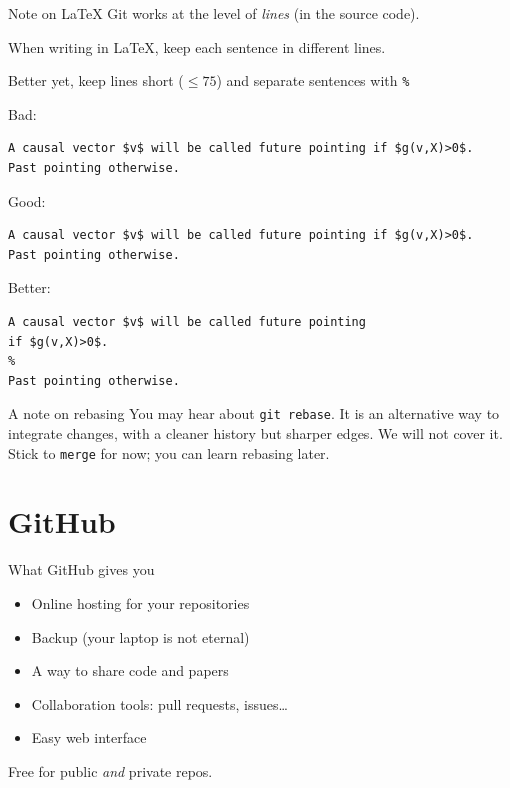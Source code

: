\documentclass[11pt]{beamer}
\begin{document}
\begin{frame}[fragile]{Note on \LaTeX}
  Git works at the level of \emph{lines} (in the source code).

  When writing in \LaTeX, keep each sentence in different
  lines.
  
  Better yet, keep lines short ($\leq 75$) and separate sentences
  with \texttt{\%}

  \vfill
  {\color{red} Bad:}
\begin{lstlisting}
A causal vector $v$ will be called future pointing if $g(v,X)>0$.  Past pointing otherwise.
\end{lstlisting}
  {\color{blue} Good:}
\begin{lstlisting}
A causal vector $v$ will be called future pointing if $g(v,X)>0$.
Past pointing otherwise.
\end{lstlisting}
  {\color{blue} Better:}
\begin{lstlisting}
A causal vector $v$ will be called future pointing
if $g(v,X)>0$.
%
Past pointing otherwise.
\end{lstlisting}
\end{frame}


\begin{frame}{A note on rebasing}
  You may hear about \texttt{git rebase}.
  \vfill
  It is an alternative way to integrate changes, with a cleaner history
  but sharper edges.
  \vfill
  \alert{We will not cover it.} Stick to \texttt{merge} for now;
  you can learn rebasing later.
\end{frame}

\section{GitHub}

\begin{frame}{What GitHub gives you}
  \begin{itemize}
    \item Online hosting for your repositories
    \item Backup (your laptop is not eternal)
    \item A way to share code and papers
    \item Collaboration tools: pull requests, issues\ldots
    \item Easy web interface
  \end{itemize}
  \vfill
  Free for public \emph{and} private repos.
\end{frame}
\end{document}
